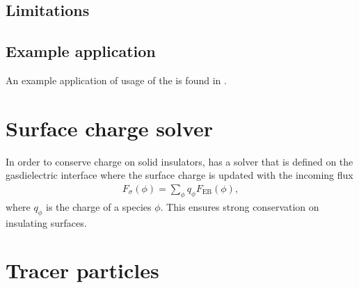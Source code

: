 \documentclass[letterpaper,10pt,english]{sphinxmanual}
\begin{document}
\subsection{Limitations}
\label{\detokenize{Solvers/RTE:limitations}}

\subsection{Example application}
\label{\detokenize{Solvers/RTE:example-application}}
An example application of usage of the  is found in {\hyperref[\detokenize{Applications/RadiativeTransferModel:chap-radiativetransfermodel}]{}}.


\section{Surface charge solver}
\label{\detokenize{Solvers/Sigma:surface-charge-solver}}\label{\detokenize{Solvers/Sigma:chap-sigmasolver}}\label{\detokenize{Solvers/Sigma::doc}}
In order to conserve charge on solid insulators,  has a solver that is defined on the gas\sphinxhyphen{}dielectric interface where the surface charge is updated with the incoming flux
\begin{equation*}
\begin{split}F_\sigma(\phi) = \sum_{\phi}q_\phi F_{\textrm{EB}}(\phi),\end{split}
\end{equation*}
where \(q_\phi\) is the charge of a species \(\phi\). This ensures strong conservation on insulating surfaces.


\section{Tracer particles}
\label{\detokenize{Solvers/TracerParticles:tracer-particles}}\label{\detokenize{Solvers/TracerParticles:chap-tracerparticlesolver}}\label{\detokenize{Solvers/TracerParticles::doc}}
\end{document}
